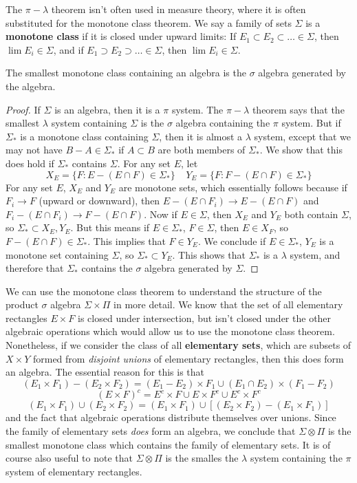 The $\pi-\lambda$ theorem isn't often used in measure theory, where it is often substituted for the monotone class theorem. We say a family of sets $\Sigma$ is a {\bf monotone class} if it is closed under upward limits: If $E_1 \subset E_2 \subset \dots \in \Sigma$, then $\lim E_i \in \Sigma$, and if $E_1 \supset E_2 \supset \dots \in \Sigma$, then $\lim E_i \in \Sigma$.

\begin{theorem}
    The smallest monotone class containing an algebra is the $\sigma$ algebra generated by the algebra.
\end{theorem}
\begin{proof}
    If $\Sigma$ is an algebra, then it is a $\pi$ system. The $\pi-\lambda$ theorem says that the smallest $\lambda$ system containing $\Sigma$ is the $\sigma$ algebra containing the $\pi$ system. But if $\Sigma_*$ is a monotone class containing $\Sigma$, then it is almost a $\lambda$ system, except that we may not have $B - A \in \Sigma_*$ if $A \subset B$ are both members of $\Sigma_*$. We show that this does hold if $\Sigma_*$ contains $\Sigma$. For any set $E$, let
    \[ X_E = \{ F: E - (E \cap F) \in \Sigma_* \}\ \ \ \ \ Y_E = \{ F: F - (E \cap F) \in \Sigma_* \} \]
    For any set $E$, $X_E$ and $Y_E$ are monotone sets, which essentially follows because if $F_i \to F$ (upward or downward), then $E - (E \cap F_i) \to E - (E \cap F)$ and $F_i - (E \cap F_i) \to F - (E \cap F)$. Now if $E \in \Sigma$, then $X_E$ and $Y_E$ both contain $\Sigma$, so $\Sigma_* \subset X_E, Y_E$. But this means if $E \in \Sigma_*$, $F \in \Sigma$, then $E \in X_F$, so $F - (E \cap F) \in \Sigma_*$. This implies that $F \in Y_E$. We conclude if $E \in \Sigma_*$, $Y_E$ is a monotone set containing $\Sigma$, so $\Sigma_* \subset Y_E$. This shows that $\Sigma_*$ is a $\lambda$ system, and therefore that $\Sigma_*$ contains the $\sigma$ algebra generated by $\Sigma$.
\end{proof}

We can use the monotone class theorem to understand the structure of the product $\sigma$ algebra $\Sigma \times \Pi$ in more detail. We know that the set of all elementary rectangles $E \times F$ is closed under intersection, but isn't closed under the other algebraic operations which would allow us to use the monotone class theorem. Nonetheless, if we consider the class of all {\bf elementary sets}, which are subsets of $X \times Y$ formed from {\it disjoint unions} of elementary rectangles, then this does form an algebra. The essential reason for this is that
%
\[ (E_1 \times F_1) - (E_2 \times F_2) = (E_1 - E_2) \times F_1 \cup (E_1 \cap E_2) \times (F_1 - F_2) \]
\[ (E \times F)^c = E^c \times F \cup E \times F^c \cup E^c \times F^c \]
\[ (E_1 \times F_1) \cup (E_2 \times F_2) = (E_1 \times F_1) \cup [(E_2 \times F_2) - (E_1 \times F_1)] \]
%
and the fact that algebraic operations distribute themselves over unions. Since the family of elementary sets {\it does} form an algebra, we conclude that $\Sigma \otimes \Pi$ is the smallest monotone class which contains the family of elementary sets. It is of course also useful to note that $\Sigma \otimes \Pi$ is the smalles the $\lambda$ system containing the $\pi$ system of elementary rectangles.


